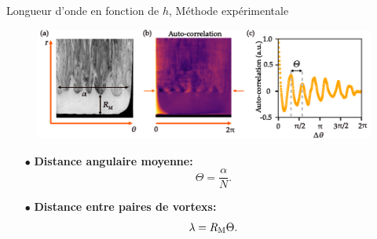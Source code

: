 \documentclass[aspectratio=169,10pt]{beamer}
\begin{document}
\begin{frame}{Longueur d'onde en fonction de $h$, Méthode expérimentale}
  \begin{figure}
      \centering
      \includegraphics[scale=.85]{./figures/Methode_analyse_lambda.pdf}
  \end{figure}

  \begin{ombredef}
      \begin{defi}
          \begin{multicols}{2}
          \begin{itemize}
              \item[$\bullet$]{\textbf{Distance angulaire moyenne:}}
                \begin{equation}
                  \Theta = \frac{\alpha}{N}.
                  \label{eq:Theta}
                \end{equation}
              \item[$\bullet$] {\textbf{Distance entre paires de vortexs:}}
                \begin{equation}
                  \lambda = R_{\rm M}\Theta.
                  \label{eq:lambda}
                \end{equation}
              \end{itemize}
          \end{multicols}
      \end{defi}
  \end{ombredef}
\end{frame}
\end{document}
